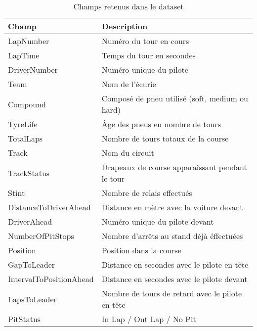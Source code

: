 \begin{table}[H]
    \begin{center}
        \caption{\label{dataset_features}Champs retenus dans le dataset}
        \begin{tabular}{ll}
            Champ                   & Description                                      \\ \hline
            LapNumber               & Numéro du tour en cours                          \\
            LapTime                 & Temps du tour en secondes                        \\
            DriverNumber            & Numéro unique du pilote                          \\
            Team                    & Nom de l'écurie                                  \\
            Compound                & Composé de pneu utilisé (soft, medium ou hard)   \\
            TyreLife                & Âge des pneus en nombre de tours                 \\
            TotalLaps               & Nombre de tours totaux de la course              \\
            Track                   & Nom du circuit                                   \\
            TrackStatus             & Drapeaux de course apparaissant pendant le tour  \\
            Stint                   & Nombre de relais effectués                       \\
            DistanceToDriverAhead   & Distance en mètre avec la voiture devant         \\
            DriverAhead             & Numéro unique du pilote devant                   \\
            NumberOfPitStops        & Nombre d'arrêts au stand déjà éffectuées         \\
            Position                & Position dans la course                          \\
            GapToLeader             & Distance en secondes avec le pilote en tête      \\
            IntervalToPositionAhead & Distance en secondes avec le pilote devant       \\
            LapsToLeader            & Nombre de tours de retard avec le pilote en tête \\
            PitStatus               & In Lap / Out Lap / No Pit                        \\
        \end{tabular}
    \end{center}
\end{table}

